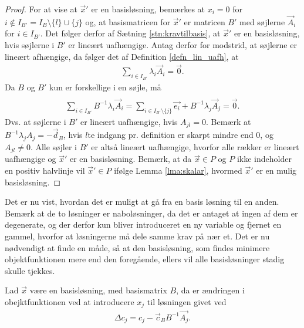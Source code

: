 \begin{proof}
For at vise at $\vec{x}'$ er en basisløsning, bemærkes at $x_i = 0$ for $i \notin I_{B'} = I_B\setminus\{l\}\cup\{j\}$ og, at basismatricen for $\vec{x}'$ er matricen $B'$ med søjlerne $\vec{A}_i$ for $i \in I_{B'}$. 
Det følger derfor af Sætning \ref{stn:kravtilbasis},
at $\vec{x}'$ er en basisløsning, hvis søjlerne i $B'$ er lineært uafhængige.
Antag derfor for modstrid, at søjlerne er lineært afhængige, da følger det af Definition \ref{defn_lin_uafh},
at
\begin{align*}
 \sum_{i \in I_{B'}} \lambda_i \vec{A}_i = \vec{0}.
\end{align*}
Da $B$ og $B'$ kun er forskellige i en søjle, må
\begin{align*}
 \\ \sum_{i \in I_{B'}}  B^{-1} \lambda_i \vec{A}_i  =\sum_{i \in I_{B'}\setminus \{j\}} \vec{e_i} + B^{-1} \lambda_j \vec{A}_j = \vec{0}.
\end{align*}
Dvs. at søjlerne i $B'$ er lineært uafhængige, hvis $A_{jl} = 0$.
Bemærk at $B^{-1} \lambda_j A_j = - \vec{d}_B$, hvis $l$te indgang pr. definition er skarpt mindre end $0$, og $A_{jl} \neq 0$.
Alle søjler i $B'$ er altså lineært uafhængige, hvorfor alle rækker er lineært uafhængige og $\vec{x}'$ er en basisløsning.
Bemærk, at da $\vec{x}\in P$ og $P$ ikke indeholder en positiv halvlinje vil $\vec{x}' \in P$ ifølge Lemma \ref{lma:skalar}, hvormed $\vec{x}'$ er en mulig basisløsning.
\end{proof}
Det er nu vist, hvordan det er muligt at gå fra en basis løsning til en anden.
 Bemærk at de to løsninger er naboløsninger, da det er antaget at ingen af dem er degenerate, og der derfor kun bliver introduceret en ny variable og fjernet en gammel, hvorfor at løsningerne må dele samme krav på nær et. 
Det er nu nødvendigt at finde en måde, så at den basisløsning, som findes minimere objektfunktionen mere end den foregående, ellers vil alle basisløsninger stadig skulle tjekkes. 
\begin{stn}
Lad $\vec{x}$ være en basisløsning, med basismatrix $B$, da er ændringen i obejktfunktionen ved at introducere $x_j$ til løsningen givet ved
\begin{align*}
 \Delta c_j = c_j-\vec{c}_B B^{-1}\vec{A_j}.
\end{align*}
\label{stn:Deltac}
\end{stn}

